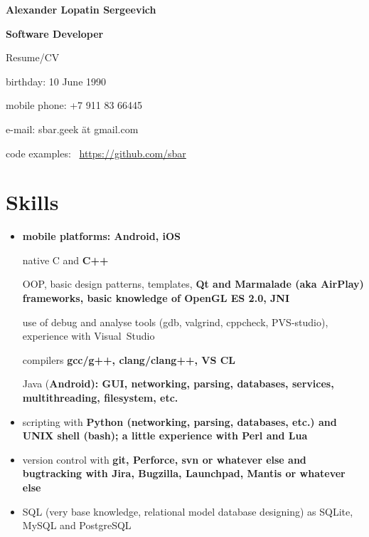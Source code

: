 \begin{center}
\fontsize{16pt}{12pt}\selectfont
\bfseries Alexander Lopatin Sergeevich\mdseries

\fontsize{12pt}{12pt}\selectfont
\bfseries Software Developer\mdseries

Resume/CV
\end{center}
{
\fontsize{11pt}{8pt}\selectfont
\begin{flushright}
\item birthday: 10 June 1990
\item mobile phone: +7 911 83 66445
\item e-mail: sbar.geek ät gmail.com
\item code examples: \
\href{https://github.com/sbar?tab=repositories}{https://github.com/sbar}
\end{flushright}
}

\fontsize{12pt}{14pt}\selectfont
\section{Skills}
\begin{itemize}

\item \bfseries mobile platforms: \mdseries Android, iOS

\subitem native C and \bfseries C++\mdseries

\subsubitem OOP, basic design patterns, templates,
\bfseries Qt \mdseries and
\bfseries Marmalade \mdseries (aka \bfseries AirPlay\mdseries) frameworks,
basic knowledge of OpenGL ES 2.0, \bfseries JNI\mdseries

\subsubitem use of debug and analyse tools (gdb, valgrind, cppcheck, PVS-studio),
experience with Visual~Studio

\subsubitem compilers \bfseries gcc/g++\mdseries, clang/clang++, VS CL

\subitem Java (\bfseries Android\mdseries): GUI, networking, parsing, databases, services, multithreading, filesystem, etc.

\item scripting with
\bfseries Python \mdseries (networking, parsing, databases, etc.)
and
\bfseries UNIX shell (bash)\mdseries;
a little experience with
\bfseries Perl \mdseries and \bfseries Lua\mdseries

\item version control with \bfseries git\mdseries, Perforce, svn or whatever else
and bugtracking with Jira, Bugzilla, Launchpad, Mantis or whatever else

\item SQL (very base knowledge, relational model database designing)
as SQLite, MySQL and PostgreSQL

\end{itemize}

